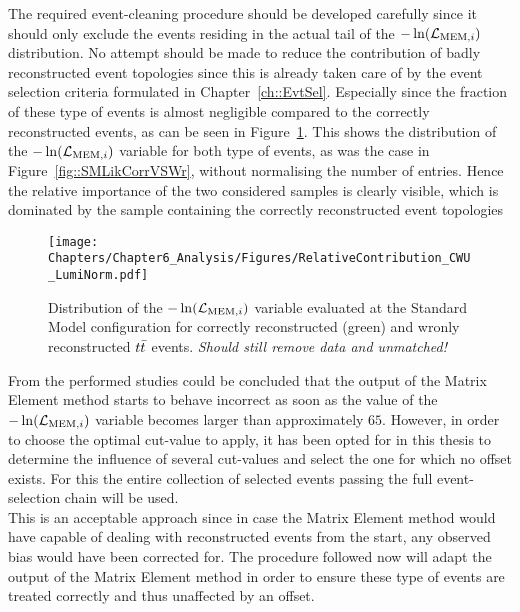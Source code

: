 The required event-cleaning procedure should be developed carefully since it should only exclude the events residing in the actual tail of the $-\ln(\mathcal{L}_{\textrm{MEM}, i})$ distribution.
No attempt should be made to reduce the contribution of badly reconstructed event topologies since this is already taken care of by the event selection criteria formulated in Chapter~\ref{ch::EvtSel}.
Especially since the fraction of these type of events is almost negligible compared to the correctly reconstructed events, as can be seen in Figure~\ref{fig::SMLikCorrVSWrUnSc}. 
This shows the distribution of the $-\ln(\mathcal{L}_{\textrm{MEM}, i})$ variable for both type of events, as was the case in Figure~\ref{fig::SMLikCorrVSWr}, without normalising the number of entries.
Hence the relative importance of the two considered samples is clearly visible, which is dominated by the sample containing the correctly reconstructed event topologies
\\
\begin{figure}[h!t]
 \centering
 \texttt{[image: Chapters/Chapter6\_Analysis/Figures/RelativeContribution\_CWU\_LumiNorm.pdf]}
 \caption{Distribution of the $-\ln(\mathcal{L}_{\textrm{MEM}, i})$ variable evaluated at the Standard Model configuration for correctly reconstructed (green) and wronly reconstructed $t\bar{t}$ events. \textit{Should still remove data and unmatched!}} \label{fig::SMLikCorrVSWrUnSc}
\end{figure}

From the performed studies could be concluded that the output of the Matrix Element method starts to behave incorrect as soon as the value of the $-\ln(\mathcal{L}_{\textrm{MEM}, i})$ variable becomes larger than approximately $65$.
However, in order to choose the optimal cut-value to apply, it has been opted for in this thesis to determine the influence of several cut-values and select the one for which no offset exists.
For this the entire collection of selected events passing the full event-selection chain will be used.
\\
This is an acceptable approach since in case the Matrix Element method would have capable of dealing with reconstructed events from the start, any observed bias would have been corrected for.
The procedure followed now will adapt the output of the Matrix Element method in order to ensure these type of events are treated correctly and thus unaffected by an offset.
\\

